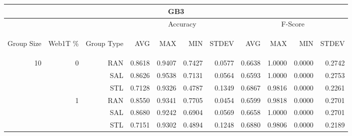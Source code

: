 \begin{center}
\begin{table}[htbp]
\begin{tabular}{ | r | r | r | r | r | r | r | r | r | r | r |}
\hline
\multicolumn{11}{|c|}{GB3}\\
\hline
 & & & \multicolumn{4}{|c|}{Accuracy} & \multicolumn{4}{|c|}{F-Score}\\ \cline{4-11}
\begin{sideways}Group Size\end{sideways} & \begin{sideways}Web1T \%\end{sideways} & \begin{sideways}Group Type\end{sideways} & \begin{sideways}AVG\end{sideways} & \begin{sideways}MAX\end{sideways} & \begin{sideways}MIN\end{sideways} & \begin{sideways}STDEV\end{sideways} & \begin{sideways}AVG\end{sideways} & \begin{sideways}MAX\end{sideways} & \begin{sideways}MIN\end{sideways} & \begin{sideways}STDEV\end{sideways}\\
\hline
\multirow{18}{*}{10}
 & \multirow{3}{*}{0} & RAN & 0.8618 & 0.9407 & 0.7427 & 0.0577 & 0.6638 & 1.0000 & 0.0000 & 0.2742\\ \cline{3-11}
 &   & SAL & 0.8626 & 0.9538 & 0.7131 & 0.0564 & 0.6593 & 1.0000 & 0.0000 & 0.2753\\ \cline{3-11}
 &   & STL & 0.7128 & 0.9326 & 0.4787 & 0.1349 & 0.6867 & 0.9816 & 0.0000 & 0.2261\\ \cline{2-11}
 & \multirow{3}{*}{1} & RAN & 0.8550 & 0.9341 & 0.7705 & 0.0454 & 0.6599 & 0.9818 & 0.0000 & 0.2701\\ \cline{3-11}
 &   & SAL & 0.8680 & 0.9242 & 0.6904 & 0.0569 & 0.6658 & 1.0000 & 0.0000 & 0.2701\\ \cline{3-11}
 &   & STL & 0.7151 & 0.9302 & 0.4894 & 0.1248 & 0.6880 & 0.9806 & 0.0000 & 0.2189\\ \cline{2-11}

\end{tabular}
\end{table}
\end{center}
